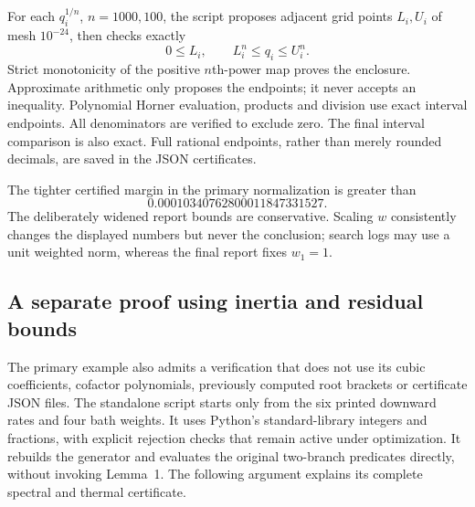 \documentclass[11pt]{article}
\begin{document}
For each $q_i^{1/n}$, $n=1000,100$, the script proposes adjacent grid points $L_i,U_i$ of mesh $10^{-24}$, then checks exactly
\[
0\leq L_i,\qquad L_i^n\leq q_i\leq U_i^n.
\]
Strict monotonicity of the positive $n$th-power map proves the enclosure. Approximate arithmetic only proposes the endpoints; it never accepts an inequality. Polynomial Horner evaluation, products and division use exact interval endpoints. All denominators are verified to exclude zero. The final interval comparison is also exact. Full rational endpoints, rather than merely rounded decimals, are saved in the JSON certificates.

The tighter certified margin in the primary normalization is greater than
\[0.00010340762800011847331527.\]
The deliberately widened report bounds are conservative. Scaling $w$ consistently changes the displayed numbers but never the conclusion; search logs may use a unit weighted norm, whereas the final report fixes $w_1=1$.

\subsection{A separate proof using inertia and residual bounds}\label{sec:separatecheck}
The primary example also admits a verification that does not use its cubic coefficients, cofactor polynomials, previously computed root brackets or certificate JSON files. The standalone script  starts only from the six printed downward rates and four bath weights. It uses Python's standard-library integers and fractions, with explicit rejection checks that remain active under optimization. It rebuilds the generator and evaluates the original two-branch predicates directly, without invoking Lemma~1. The following argument explains its complete spectral and thermal certificate.
\end{document}
